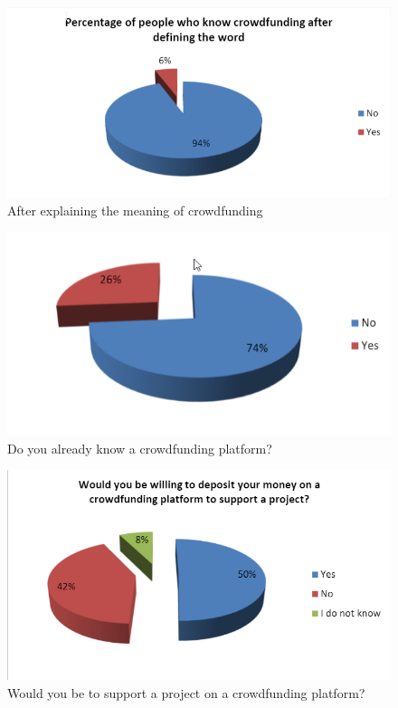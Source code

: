 \begin{figure}[!ht]
      \center
      \includegraphics[scale=0.60]{assets/knowCrowd.png}
      \caption{After explaining the meaning of crowdfunding}
      \label{fig:knowCrowd}
\end{figure}

\begin{figure}[!ht]
      \center
      \includegraphics[scale=0.60]{assets/knowPlatform.png}
      \caption{Do you already know a crowdfunding platform?}
      \label{fig:knowPlatform}
\end{figure}

\begin{figure}[!ht]
      \center
      \includegraphics[scale=0.60]{assets/willing.png}
      \caption{Would you be to support a project on a crowdfunding platform?}
      \label{fig:willing}
\end{figure}



